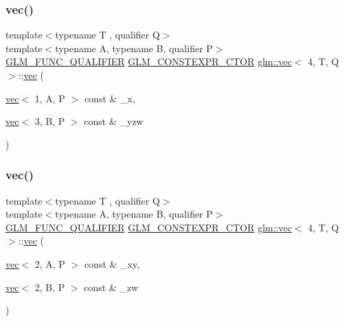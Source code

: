 \mbox{\label{structglm_1_1vec_3_014_00_01_t_00_01_q_01_4_a25424f78a9e0345486eeaafbcd1c8a7e}} 
\subsubsection{\texorpdfstring{vec()}{vec()}\hspace{0.1cm}{\footnotesize\ttfamily [32/34]}}
{\footnotesize\ttfamily template$<$typename T , qualifier Q$>$ \\
template$<$typename A, typename B, qualifier P$>$ \\
\mbox{\hyperlink{setup_8hpp_a33fdea6f91c5f834105f7415e2a64407}{G\+L\+M\+\_\+\+F\+U\+N\+C\+\_\+\+Q\+U\+A\+L\+I\+F\+I\+ER}} \mbox{\hyperlink{setup_8hpp_ad34178a09666081abdb573c14d1f4a5a}{G\+L\+M\+\_\+\+C\+O\+N\+S\+T\+E\+X\+P\+R\+\_\+\+C\+T\+OR}} \mbox{\hyperlink{structglm_1_1vec}{glm\+::vec}}$<$ 4, T, Q $>$\+::\mbox{\hyperlink{structglm_1_1vec}{vec}} (\begin{DoxyParamCaption}\item[{\mbox{\hyperlink{structglm_1_1vec}{vec}}$<$ 1, A, P $>$ const \&}]{\+\_\+x,  }\item[{\mbox{\hyperlink{structglm_1_1vec}{vec}}$<$ 3, B, P $>$ const \&}]{\+\_\+yzw }\end{DoxyParamCaption})}

\mbox{\label{structglm_1_1vec_3_014_00_01_t_00_01_q_01_4_a6273e714a533a4354356ad4a130bf535}} 
\subsubsection{\texorpdfstring{vec()}{vec()}\hspace{0.1cm}{\footnotesize\ttfamily [33/34]}}
{\footnotesize\ttfamily template$<$typename T , qualifier Q$>$ \\
template$<$typename A, typename B, qualifier P$>$ \\
\mbox{\hyperlink{setup_8hpp_a33fdea6f91c5f834105f7415e2a64407}{G\+L\+M\+\_\+\+F\+U\+N\+C\+\_\+\+Q\+U\+A\+L\+I\+F\+I\+ER}} \mbox{\hyperlink{setup_8hpp_ad34178a09666081abdb573c14d1f4a5a}{G\+L\+M\+\_\+\+C\+O\+N\+S\+T\+E\+X\+P\+R\+\_\+\+C\+T\+OR}} \mbox{\hyperlink{structglm_1_1vec}{glm\+::vec}}$<$ 4, T, Q $>$\+::\mbox{\hyperlink{structglm_1_1vec}{vec}} (\begin{DoxyParamCaption}\item[{\mbox{\hyperlink{structglm_1_1vec}{vec}}$<$ 2, A, P $>$ const \&}]{\+\_\+xy,  }\item[{\mbox{\hyperlink{structglm_1_1vec}{vec}}$<$ 2, B, P $>$ const \&}]{\+\_\+zw }\end{DoxyParamCaption})}

